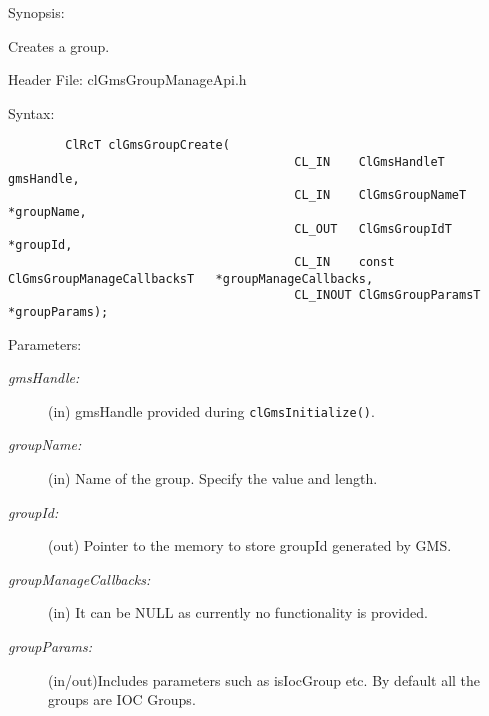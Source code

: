 \begin{flushleft}
\begin{Desc}

\item[Synopsis:]

 Creates a group.  \end{Desc}

\begin{Desc}
  \item[Header File:]
  clGmsGroupManageApi.h\end{Desc}

  \begin{Desc}
  \item[Syntax:]
  \footnotesize\begin{verbatim}        ClRcT clGmsGroupCreate(
                            			CL_IN    ClGmsHandleT                        gmsHandle,
                            			CL_IN    ClGmsGroupNameT                    *groupName,
                            			CL_OUT   ClGmsGroupIdT                      *groupId,
                            			CL_IN    const ClGmsGroupManageCallbacksT   *groupManageCallbacks,
                            			CL_INOUT ClGmsGroupParamsT                  *groupParams);
 \end{verbatim}
  \normalsize
  \end{Desc}

 \begin{Desc}
\item[Parameters:]
\begin{description}
  \item[{\em gmsHandle:}] (in) gmsHandle provided during {\tt{clGmsInitialize()}}.
 \item[{\em groupName:}] (in) Name of the group. Specify the value and length.
 \item[{\em groupId:}] (out) Pointer to the memory to store groupId generated by GMS.
 \item[{\em groupManageCallbacks:}](in) It can be NULL as currently no functionality is provided.
 \item[{\em groupParams:}] (in/out)Includes parameters such as isIocGroup etc. By default all
              the groups are IOC Groups.
 \end{description}
 \end{Desc}


\end{flushleft}

